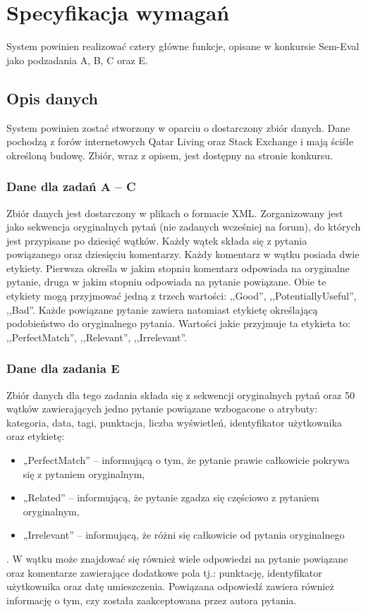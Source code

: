 \chapter{Specyfikacja wymagań}
System powinien realizować cztery główne funkcje, opisane w konkursie Sem-Eval jako podzadania A, B, C oraz E.

\section{Opis danych}
System powinien zostać stworzony w oparciu o dostarczony zbiór danych. Dane pochodzą z forów internetowych Qatar Living oraz Stack Exchange i mają ściśle określoną budowę. Zbiór, wraz z opisem, jest dostępny na stronie konkursu.

\subsection{Dane dla zadań A -- C}
Zbiór danych jest dostarczony w plikach o formacie XML. Zorganizowany jest jako sekwencja oryginalnych pytań (nie zadanych wcześniej na forum), do których jest przypisane po dziesięć wątków. Każdy wątek składa się z pytania powiązanego oraz dziesięciu komentarzy.
Każdy komentarz w wątku posiada dwie etykiety. Pierwsza określa w jakim stopniu komentarz odpowiada na oryginalne pytanie, druga w jakim stopniu odpowiada na pytanie powiązane. Obie te etykiety mogą przyjmować jedną z trzech wartości: ,,Good'', ,,PotentiallyUseful'', ,,Bad''.
Każde powiązane pytanie zawiera natomiast etykietę określającą podobieństwo do oryginalnego pytania. Wartości jakie przyjmuje ta etykieta to: ,,PerfectMatch'', ,,Relevant'', ,,Irrelevant''.

\subsection{Dane dla zadania E}
Zbiór danych dla tego zadania składa się z sekwencji oryginalnych pytań oraz 50 wątków zawierających jedno pytanie powiązane wzbogacone o atrybuty: kategoria, data, tagi, punktacja, liczba wyświetleń, identyfikator użytkownika oraz etykietę:
\begin{itemize}
\item „PerfectMatch'' – informującą o tym, że pytanie prawie całkowicie pokrywa się z pytaniem oryginalnym,
\item „Related'' – informującą, że pytanie zgadza się częściowo z pytaniem oryginalnym,
\item „Irrelevant'' – informującą, że różni się całkowicie od pytania oryginalnego
\end{itemize}.
W wątku może znajdować się również wiele odpowiedzi na pytanie powiązane oraz komentarze zawierające dodatkowe pola tj.: punktację, identyfikator użytkownika oraz datę umieszczenia. Powiązana odpowiedź zawiera również informację o tym, czy została zaakceptowana przez autora pytania.

